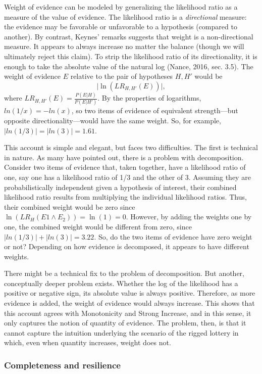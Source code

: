 \documentclass[
  10pt,
  dvipsnames,enabledeprecatedfontcommands]{scrartcl}
\begin{document}
Weight of evidence can be modeled by generalizing the likelihood ratio
as a measure of the value of evidence. The likelihood ratio is a
\emph{directional} measure: the evidence may be favorable or unfavorable
to a hypothesis (compared to another). By contrast, Keynes' remarks
suggests that weight is a non-directional measure. It appears to always
increase no matter the balance (though we will ultimately reject this
claim). To strip the likelihood ratio of its directionality, it is
enough to take the absolute value of the natural log (Nance, 2016, sec.
3.5). The weight of evidence \(E\) relative to the pair of hypotheses
\(H, H'\) would be \[\vert \ln (LR_{H, H'}(E)) \vert, \] where
\(LR_{H, H'}(E)=\frac{P(E \vert H)}{P(E \vert H')}\). By the properties
of logarithms, \(ln(1/x) = -ln(x)\), so two items of evidence of
equivalent strength---but opposite directionality---would have the same
weight. So, for example, \(|ln(1/3)|= |ln(3)| = 1.61\).

This account is simple and elegant, but faces two difficulties. The
first is technical in nature. As many have pointed out, there is a
problem with decomposition. Consider two items of evidence that, taken
together, have a likelihood ratio of one, say one has a likelihood ratio
of 1/3 and the other of 3. Assuming they are probabilistically
independent given a hypothesis of interest, their combined likelihood
ratio results from multiplying the individual likelihood ratios. Thus,
their combined weight would be zero since
\(\ln (LR_H(E1 \wedge E_2))=\ln (1) = 0\). However, by adding the
weights one by one, the combined weight would be different from zero,
since \(|ln(1/3)| + |ln(3)| = 3.22\). So, do the two items of evidence
have zero weight or not? Depending on how evidence is decomposed, it
appears to have different weights.

There might be a technical fix to the problem of decomposition. But
another, conceptually deeper problem exists. Whether the log of the
likelihood has a positive or negative sign, its absolute value is always
positive. Therefore, as more evidence is added, the weight of evidence
would always increase. This shows that this account agrees with
Monotonicity and Strong Increase, and in this sense, it only captures
the notion of quantity of evidence. The problem, then, is that it cannot
capture the intuition underlying the scenario of the rigged lottery in
which, even when quantity increases, weight does not.

\hypertarget{completeness-and-resilience}{%
\subsubsection{Completeness and
resilience}\label{completeness-and-resilience}}
\end{document}

